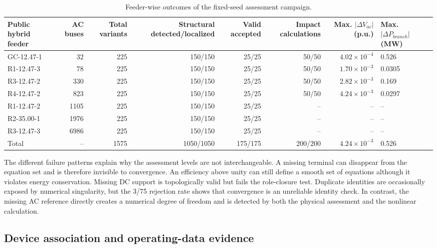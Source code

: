 \begin{table}[t]
\centering
\caption{Feeder-wise outcomes of the fixed-seed assessment campaign.}
\label{tab:feeder-results}
\footnotesize
\begin{tabularx}{\textwidth}{@{}lrrrrrrX@{}}
\toprule
Public hybrid feeder & AC buses & Total variants & Structural detected/localized & Valid accepted & Impact calculations & Max. $|\Delta V_{ac}|$ (p.u.) & Max. $|\Delta P_{branch}|$ (MW) \\
\midrule
GC-12.47-1 & 32 & 225 & 150/150 & 25/25 & 50/50 & $4.02\!\times\!10^{-4}$ & 0.526 \\
R1-12.47-3 & 78 & 225 & 150/150 & 25/25 & 50/50 & $1.70\!\times\!10^{-3}$ & 0.0305 \\
R3-12.47-2 & 330 & 225 & 150/150 & 25/25 & 50/50 & $2.82\!\times\!10^{-3}$ & 0.169 \\
R4-12.47-2 & 823 & 225 & 150/150 & 25/25 & 50/50 & $4.24\!\times\!10^{-3}$ & 0.0297 \\
R1-12.47-2 & 1105 & 225 & 150/150 & 25/25 & -- & -- & -- \\
R2-35.00-1 & 1976 & 225 & 150/150 & 25/25 & -- & -- & -- \\
R3-12.47-3 & 6986 & 225 & 150/150 & 25/25 & -- & -- & -- \\
\midrule
Total & -- & 1575 & 1050/1050 & 175/175 & 200/200 & $4.24\!\times\!10^{-3}$ & 0.526 \\
\bottomrule
\end{tabularx}
\end{table}

The different failure patterns explain why the assessment levels are not
interchangeable. A missing terminal can disappear from the equation set and is
therefore invisible to convergence. An efficiency above unity can still define
a smooth set of equations although it violates energy conservation. Missing DC
support is topologically valid but fails the role-closure test. Duplicate
identities are occasionally exposed by numerical singularity, but the 3/75
rejection rate shows that convergence is an unreliable identity check. In
contrast, the missing AC reference directly creates a numerical degree of
freedom and is detected by both the physical assessment and the nonlinear
calculation.

\subsection{Device association and operating-data evidence}

